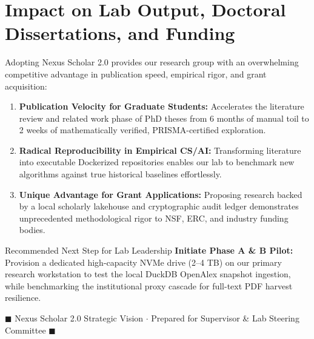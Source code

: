 \documentclass[10pt,a4paper]{article}
\begin{document}
\section{Impact on Lab Output, Doctoral Dissertations, and Funding}

Adopting Nexus Scholar 2.0 provides our research group with an overwhelming competitive advantage in publication speed, empirical rigor, and grant acquisition:

\begin{enumerate}[leftmargin=1.4em, itemsep=2.5pt, topsep=2pt]
    \item \textbf{Publication Velocity for Graduate Students:} Accelerates the literature review and related work phase of PhD theses from 6 months of manual toil to 2 weeks of mathematically verified, PRISMA-certified exploration.
    \item \textbf{Radical Reproducibility in Empirical CS/AI:} Transforming literature into executable Dockerized repositories enables our lab to benchmark new algorithms against true historical baselines effortlessly.
    \item \textbf{Unique Advantage for Grant Applications:} Proposing research backed by a local scholarly lakehouse and cryptographic audit ledger demonstrates unprecedented methodological rigor to NSF, ERC, and industry funding bodies.
\end{enumerate}

\begin{visionbox}{Recommended Next Step for Lab Leadership}
\textbf{Initiate Phase A \& B Pilot:} Provision a dedicated high-capacity NVMe drive (2--4 TB) on our primary research workstation to test the local DuckDB OpenAlex snapshot ingestion, while benchmarking the institutional proxy cascade for full-text PDF harvest resilience.
\end{visionbox}

\vspace{10pt}
\begin{center}
\textcolor{Slate!70}{\footnotesize $\blacksquare$ Nexus Scholar 2.0 Strategic Vision $\cdot$ Prepared for Supervisor \& Lab Steering Committee $\blacksquare$}
\end{center}
\end{document}
